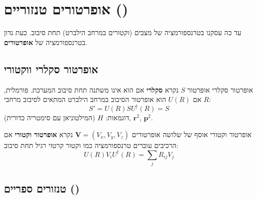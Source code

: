 \begin{center}
\end{center}

\newpage

\section{אופרטורים טנזוריים ()}

עד כה עסקנו בטרנספורמציה של מצבים (וקטורים במרחב הילברט) תחת סיבוב. כעת נדון בטרנספורמציה של \textbf{אופרטורים}.

\subsection{אופרטור סקלרי ווקטורי}

\begin{definitionbox}{אופרטור סקלרי}
אופרטור $S$ נקרא \textbf{סקלרי} אם הוא אינו משתנה תחת סיבוב המערכת. פורמלית, אם $U(R)$ הוא אופרטור הסיבוב במרחב הילברט המתאים לסיבוב מרחבי $R$:
\[
S' = U(R) S U^\dagger(R) = S
\]
דוגמאות: $H$ (המילטוניאן עם סימטריה כדורית), $\mathbf{r}^2$, $\mathbf{p}^2$.
\end{definitionbox}

\begin{definitionbox}{אופרטור וקטורי}
אוסף של שלושה אופרטורים $\mathbf{V} = (V_x, V_y, V_z)$ נקרא \textbf{אופרטור וקטורי} אם הרכיבים עוברים טרנספורמציה כמו וקטור קרטזי רגיל תחת סיבוב:
\[
U(R) V_i U^\dagger(R) = \sum_{j} R_{ij} V_j
\]
\end{definitionbox}
\subsection{טנזורים ספריים ()}

